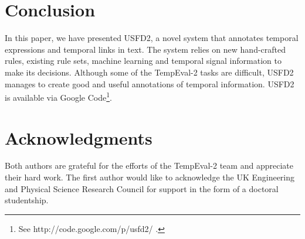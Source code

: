 \documentclass[11pt]{article}
\begin{document}
\section{Conclusion}
\label{conclusion}

In this paper, we have presented USFD2, a novel system that annotates temporal expressions and temporal links in text. The system relies on new hand-crafted rules, existing rule sets, machine learning and temporal signal information to make its decisions. Although some of the TempEval-2 tasks are difficult, USFD2 manages to create good and useful annotations of temporal information. USFD2 is available via Google Code\footnote{See http://code.google.com/p/usfd2/ .}.

\section*{Acknowledgments}
Both authors are grateful for the efforts of the TempEval-2 team and appreciate their hard work. The first author would like to acknowledge the UK Engineering and Physical Science Research Council for support in the form of a doctoral studentship.



\end{document}
